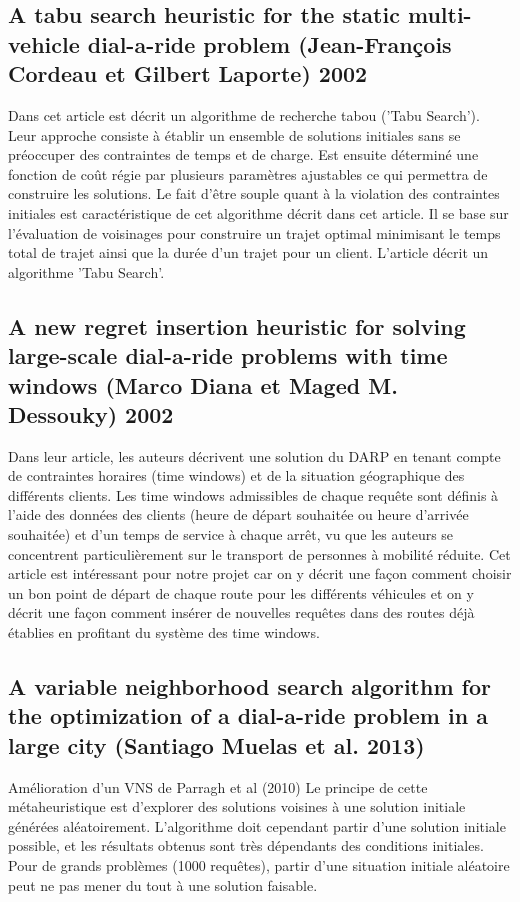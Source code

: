 \documentclass[10pt,a4paper]{report}
\begin{document}
\subsection*{A tabu search heuristic for the static multi-vehicle dial-a-ride problem (Jean-François Cordeau et Gilbert Laporte) 2002}
Dans cet article est décrit un algorithme de recherche tabou ('Tabu Search'). Leur approche consiste à établir un ensemble de solutions initiales sans se préoccuper des contraintes de temps et de charge. Est ensuite déterminé une fonction de coût régie par plusieurs paramètres ajustables ce qui permettra de construire les solutions. Le fait d'être souple quant à la violation des contraintes initiales est caractéristique de cet algorithme décrit dans cet article. Il se base sur l'évaluation de voisinages pour construire un trajet optimal minimisant le temps total de trajet ainsi que la durée d'un trajet pour un client. L'article décrit un algorithme 'Tabu Search'.
\subsection*{A new regret insertion heuristic for solving large-scale dial-a-ride problems with time windows (Marco Diana et Maged M. Dessouky) 2002} 
 Dans leur article, les auteurs décrivent une solution du DARP en tenant compte de contraintes horaires (time windows) et de la situation géographique des différents clients. Les time windows admissibles de chaque requête sont définis à l'aide des données des clients (heure de départ souhaitée ou heure d'arrivée souhaitée) et d'un temps de service à chaque arrêt, vu que les auteurs se concentrent particulièrement sur le transport de personnes à mobilité réduite. Cet article est intéressant pour notre projet car on y décrit une façon comment choisir un bon point de départ de chaque route pour les différents véhicules et on y décrit une façon comment insérer de nouvelles requêtes dans des routes déjà établies en profitant du système des time windows.
\subsection*{A variable neighborhood search algorithm for the optimization of a dial-a-ride problem in a large city (Santiago Muelas et al. 2013)}
Amélioration d'un VNS de Parragh et al (2010)
Le principe de cette métaheuristique est d'explorer des solutions voisines à une solution initiale générées aléatoirement. L'algorithme doit cependant partir d'une solution initiale possible, et les résultats obtenus sont très dépendants des conditions initiales. Pour de grands problèmes (1000 requêtes), partir d'une situation initiale aléatoire peut ne pas mener du tout à une solution faisable.
\end{document}
